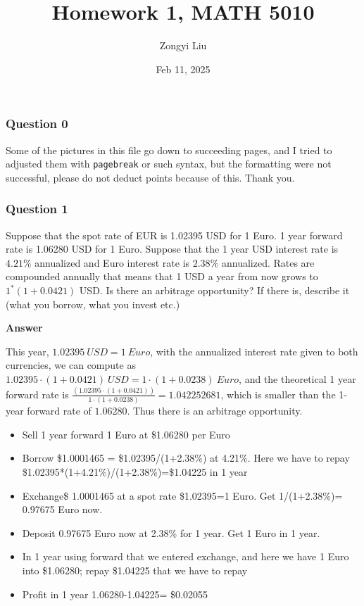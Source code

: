 \documentclass[margin=1in]{article}
\title{Homework 1, MATH 5010}
\author{Zongyi Liu}
\date{Feb 11, 2025}
\begin{document}
		\maketitle
		
		\subsubsection*{Question 0}
		Some of the pictures in this file go down to succeeding pages, and I tried to adjusted them with \texttt{pagebreak} or such syntax, but the formatting were not successful, please do not deduct points because of this. Thank you.
		
		\subsubsection*{Question 1}
		 Suppose that the spot rate of EUR is 1.02395 USD for 1 Euro. 1 year forward rate is 1.06280 USD for 1 Euro. Suppose that the 1 year USD interest rate is $4.21 \%$ annualized and Euro interest rate is $2.38 \%$ annualized. Rates are compounded annually that means that 1 USD a year from now grows to $1^{*}(1+0.0421)$ USD. Is there an arbitrage opportunity? If there is, describe it (what you borrow, what you invest etc.)
		 
		 \textbf{Answer}
		 
		 This year, $1.02395\ USD = 1\ Euro$, with the annualized interest rate given to both currencies, we can compute as $1.02395\cdot(1+0.0421)\ USD=1\cdot(1+0.0238)\ Euro$, and the theoretical 1 year forward rate is  $\frac{\left(1.02395\cdot\left(1+0.0421\right)\right)}{1\cdot\left(1+0.0238\right)}=1.042252681$, which is smaller than the 1-year forward rate of $1.06280$. Thus there is an arbitrage opportunity.
		 
		 \begin{itemize}
		 \item Sell 1 year forward 1 Euro at \$1.06280 per Euro
		 \item Borrow \$1.0001465 = \$1.02395/(1+2.38\%) at 4.21\%. Here we have to repay \$1.02395*(1+4.21\%)/(1+2.38\%)=\$1.04225 in 1 year
		 \item Exchange\$ 1.0001465 at a spot rate \$1.02395=1 Euro. Get 1/(1+2.38\%)= 0.97675 Euro now.
		 \item Deposit 0.97675 Euro now at 2.38\% for 1 year. Get 1 Euro in 1 year.
		 \item In 1 year using forward that we entered exchange, and here we have 1 Euro into \$1.06280; repay \$1.04225 that we have to repay
		 \item Profit in 1 year 1.06280-1.04225= \$0.02055
		 \end{itemize}
		 
\end{document}

